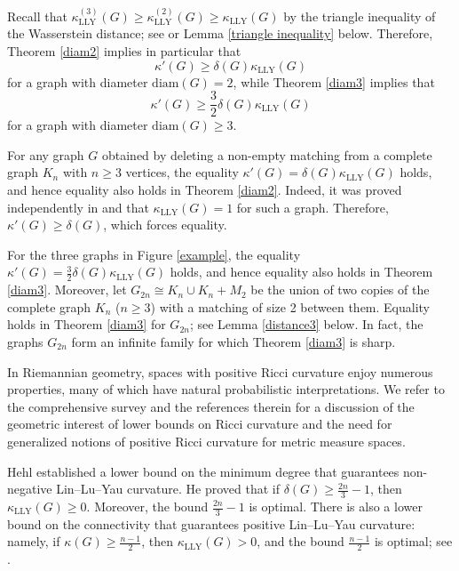 \documentclass[10pt,a4paper]{article}
\theoremstyle{definition}
\theoremstyle{definition}
\theoremstyle{nonumber}
\begin{document}
Recall that $\kappa_{\mathrm{LLY}}^{(3)}(G) \geq\kappa_{\mathrm{LLY}}^{(2)}(G) \geq \kappa_{\mathrm{LLY}}(G)$ by the triangle inequality of the Wasserstein distance; see \cite[Lemma 2.3]{LLY} or Lemma \ref{triangle inequality} below. Therefore, Theorem \ref{diam2} implies in particular that
$$
\kappa'(G) \geq \delta(G)  \kappa_{\mathrm{LLY}}(G)
$$
for a graph with diameter $\mathrm{diam}(G)=2$, while Theorem \ref{diam3} implies that
$$
\kappa'(G) \geq \frac{3}{2}\delta(G)  \kappa_{\mathrm{LLY}}(G)
$$
for a graph with diameter $\mathrm{diam}(G)\geq3$. 

For any graph $G$ obtained by deleting a non-empty matching from a complete graph $K_n$ with $n \geq 3$ vertices, the equality $\kappa'(G) = \delta(G)  \kappa_{\mathrm{LLY}}(G)$ holds, and hence equality also holds in Theorem \ref{diam2}. 
Indeed, it was proved independently in \cite[Theorem 1.3]{Cushing} and \cite[Theorem 1]{Huang} that $\kappa_{\mathrm{LLY}}(G) = 1$ for such a graph. Therefore, $\kappa'(G) \geq \delta(G)$, which forces equality.

For the three graphs in Figure \ref{example}, the equality $\kappa'(G) = \frac{3}{2}\delta(G)  \kappa_{\mathrm{LLY}}(G)$ holds, and hence equality also holds in Theorem \ref{diam3}.
Moreover, let $G_{2n}\cong K_n \cup K_n +M_2$ be the union of two copies of the complete graph $K_n$ ($n\geq3$) with a matching of size 2 between them. Equality holds in Theorem \ref{diam3} for $G_{2n}$; see Lemma \ref{distance3} below.  
In fact, the graphs $G_{2n}$ form an infinite family for which Theorem \ref{diam3} is sharp.

In Riemannian geometry, spaces with positive Ricci curvature enjoy numerous properties, many of which have natural probabilistic interpretations.
We refer to the comprehensive survey \cite{Lott} and the references therein for a discussion of the geometric interest of lower bounds on Ricci curvature and the need for generalized notions of positive Ricci curvature for metric measure spaces.

Hehl \cite{Hehlmin} established a lower bound on the minimum degree that guarantees non-negative Lin--Lu--Yau curvature. He proved that if $\delta(G)\geq \frac{2n}{3}-1$, then $\kappa_{\mathrm{LLY}}(G)\geq0$. Moreover, the bound $\frac{2n}{3}-1$ is optimal.
There is also a lower bound on the connectivity that guarantees positive Lin--Lu--Yau curvature: namely, if $\kappa(G)\geq \frac{n-1}{2}$, then $\kappa_{\mathrm{LLY}}(G)>0$, and the bound $\frac{n-1}{2}$ is optimal; see \cite[Theorem 1.7 and Theorem 1.8]{Liu}.
\end{document}
